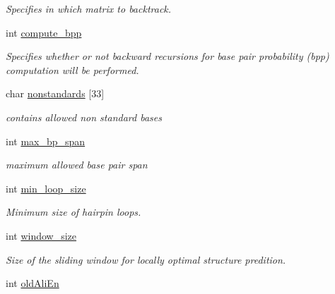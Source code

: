 \begin{DoxyCompactItemize}
\begin{DoxyCompactList}\small\item\em Specifies in which matrix to backtrack. \end{DoxyCompactList}\item 
\hypertarget{group__model__details_aa0c3e03d9064363e27adcc92b8d0380f}{}int \hyperlink{group__model__details_aa0c3e03d9064363e27adcc92b8d0380f}{compute\+\_\+bpp}\label{group__model__details_aa0c3e03d9064363e27adcc92b8d0380f}

\begin{DoxyCompactList}\small\item\em Specifies whether or not backward recursions for base pair probability (bpp) computation will be performed. \end{DoxyCompactList}\item 
\hypertarget{group__model__details_a25cb894b76ec876a679a45448dea5b0f}{}char \hyperlink{group__model__details_a25cb894b76ec876a679a45448dea5b0f}{nonstandards} \mbox{[}33\mbox{]}\label{group__model__details_a25cb894b76ec876a679a45448dea5b0f}

\begin{DoxyCompactList}\small\item\em contains allowed non standard bases \end{DoxyCompactList}\item 
\hypertarget{group__model__details_a659e5fcc6e8c9f1a68e7de6548eef3b0}{}int \hyperlink{group__model__details_a659e5fcc6e8c9f1a68e7de6548eef3b0}{max\+\_\+bp\+\_\+span}\label{group__model__details_a659e5fcc6e8c9f1a68e7de6548eef3b0}

\begin{DoxyCompactList}\small\item\em maximum allowed base pair span \end{DoxyCompactList}\item 
int \hyperlink{group__model__details_a9ed7ba42fcc46915c5c0c524f3d255f5}{min\+\_\+loop\+\_\+size}
\begin{DoxyCompactList}\small\item\em Minimum size of hairpin loops. \end{DoxyCompactList}\item 
\hypertarget{group__model__details_abea42f9229f8d8d6bcbedef316315bfc}{}int \hyperlink{group__model__details_abea42f9229f8d8d6bcbedef316315bfc}{window\+\_\+size}\label{group__model__details_abea42f9229f8d8d6bcbedef316315bfc}

\begin{DoxyCompactList}\small\item\em Size of the sliding window for locally optimal structure predition. \end{DoxyCompactList}\item 
\hypertarget{group__model__details_ab53aec4503130877973c6111ae6f0f76}{}int \hyperlink{group__model__details_ab53aec4503130877973c6111ae6f0f76}{old\+Ali\+En}\label{group__model__details_ab53aec4503130877973c6111ae6f0f76}


\end{DoxyCompactItemize}

